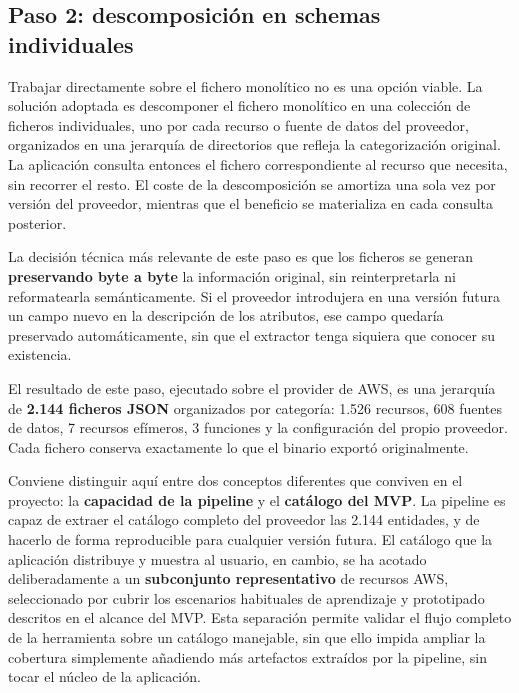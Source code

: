 \documentclass{article}
\begin{document}
{        \subsection{Paso 2: descomposición en schemas individuales}
        \justify
        Trabajar directamente sobre el fichero monolítico no es una opción viable. La solución adoptada es descomponer el fichero monolítico en una colección de
        ficheros individuales, uno por cada recurso o fuente de datos del proveedor,
        organizados en una jerarquía de directorios que refleja la categorización
        original. La aplicación consulta entonces el fichero correspondiente al
        recurso que necesita, sin recorrer el resto. El coste de la descomposición se
        amortiza una sola vez por versión del proveedor, mientras que el beneficio se
        materializa en cada consulta posterior.

        \justify
        La decisión técnica más relevante de este paso es que los ficheros se generan
        \textbf{preservando byte a byte} la información original, sin reinterpretarla
        ni reformatearla semánticamente. Si el proveedor introdujera en una versión
        futura un campo nuevo en la descripción de los atributos, ese campo quedaría
        preservado automáticamente, sin que el extractor tenga siquiera que conocer su
        existencia.

        \justify
        El resultado de este paso, ejecutado sobre el provider de AWS, es una
        jerarquía de \textbf{2.144 ficheros JSON} organizados por categoría: 1.526
        recursos, 608 fuentes de datos, 7 recursos efímeros, 3 funciones y la
        configuración del propio proveedor. Cada fichero conserva exactamente lo que
        el binario exportó originalmente.

        \justify
        Conviene distinguir aquí entre dos conceptos diferentes que conviven en el
        proyecto: la \textbf{capacidad de la pipeline} y el \textbf{catálogo del
        MVP}. La pipeline es capaz de extraer el catálogo completo del proveedor
        las 2.144 entidades, y de hacerlo de forma
        reproducible para cualquier versión futura. El catálogo que la aplicación
        distribuye y muestra al usuario, en cambio, se ha acotado deliberadamente a
        un \textbf{subconjunto representativo} de recursos AWS, seleccionado por cubrir los escenarios habituales de aprendizaje y
        prototipado descritos en el alcance del MVP. Esta separación permite
        validar el flujo completo de la herramienta sobre un catálogo manejable,
        sin que ello impida ampliar la cobertura simplemente añadiendo más
        artefactos extraídos por la pipeline, sin tocar el núcleo de la
        aplicación.

}
\end{document}
